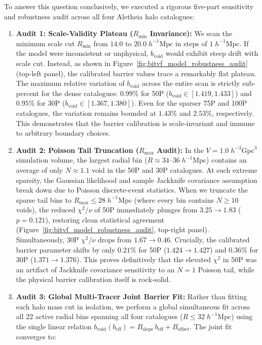 \documentclass[12pt]{report}
\begin{document}
To answer this question conclusively, we executed a rigorous five-part sensitivity and robustness audit across all four Aletheia halo catalogues:
\begin{enumerate}
    \item \textbf{Audit 1: Scale-Validity Plateau ($R_{\mathrm{min}}$ Invariance):} We scan the minimum scale cut $R_{\mathrm{min}}$ from $14.0$ to $20.0\;h^{-1}\mathrm{Mpc}$ in steps of $1\;h^{-1}\mathrm{Mpc}$. If the model were inconsistent or unphysical, $b_{\mathrm{void}}$ would exhibit steep drift with scale cut. Instead, as shown in Figure~\ref{fig:bitvf_model_robustness_audit} (top-left panel), the calibrated barrier values trace a remarkably flat plateau. The maximum relative variation of $b_{\mathrm{void}}$ across the entire scan is strictly sub-percent for the dense catalogues: $0.99\%$ for 50P ($b_{\mathrm{void}} \in [1.419, 1.433]$) and $0.95\%$ for 30P ($b_{\mathrm{void}} \in [1.367, 1.380]$). Even for the sparser 75P and 100P catalogues, the variation remains bounded at $1.43\%$ and $2.53\%$, respectively. This demonstrates that the barrier calibration is scale-invariant and immune to arbitrary boundary choices.
    \item \textbf{Audit 2: Poisson Tail Truncation ($R_{\mathrm{max}}$ Audit):} In the $V = 1.0\;h^{-3}\mathrm{Gpc}^3$ simulation volume, the largest radial bin ($R \approx 34$--$36\;h^{-1}\mathrm{Mpc}$) contains an average of only $N \approx 1.1$ void in the 50P and 30P catalogues. At such extreme sparsity, the Gaussian likelihood and sample Jackknife covariance assumption break down due to Poisson discrete-event statistics. When we truncate the sparse tail bins to $R_{\mathrm{max}} \le 28\;h^{-1}\mathrm{Mpc}$ (where every bin contains $N \ge 10$ voids), the reduced $\chi^2/\nu$ of 50P immediately plunges from $3.25 \rightarrow \mathbf{1.83}$ ($p = 0.121$), restoring clean statistical agreement (Figure~\ref{fig:bitvf_model_robustness_audit}, top-right panel). Simultaneously, 30P $\chi^2/\nu$ drops from $1.67 \rightarrow \mathbf{0.46}$. Crucially, the calibrated barrier parameter shifts by only $\mathbf{0.21\%}$ for 50P ($1.424 \rightarrow 1.427$) and $\mathbf{0.36\%}$ for 30P ($1.371 \rightarrow 1.376$). This proves definitively that the elevated $\chi^2$ in 50P was an artifact of Jackknife covariance sensitivity to an $N=1$ Poisson tail, while the physical barrier calibration itself is rock-solid.
    \item \textbf{Audit 3: Global Multi-Tracer Joint Barrier Fit:} Rather than fitting each halo mass cut in isolation, we perform a global simultaneous fit across all 22 active radial bins spanning all four catalogues ($R \le 32\;h^{-1}\mathrm{Mpc}$) using the single linear relation $b_{\mathrm{void}}(b_{\mathrm{eff}}) = B_{\mathrm{slope}}\,b_{\mathrm{eff}} + B_{\mathrm{offset}}$. The joint fit converges to:

\end{enumerate}
\end{document}
